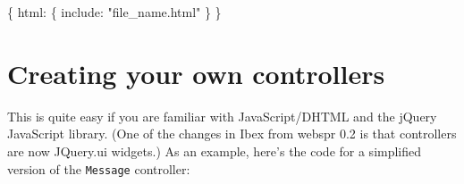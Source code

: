 \documentclass[
]{article}
\newenvironment{Shaded}{}{}
\newcommand{\DataTypeTok}[1]{\textcolor[rgb]{0.56,0.13,0.00}{#1}}
\newcommand{\NormalTok}[1]{#1}
\newcommand{\OperatorTok}[1]{\textcolor[rgb]{0.40,0.40,0.40}{#1}}
\newcommand{\StringTok}[1]{\textcolor[rgb]{0.25,0.44,0.63}{#1}}
\begin{document}
\begin{Shaded}
\begin{Highlighting}[]
\NormalTok{    \{ }\DataTypeTok{html}\OperatorTok{:}\NormalTok{ \{ }\DataTypeTok{include}\OperatorTok{:} \StringTok{"file\_name.html"}\NormalTok{ \} \}}
\end{Highlighting}
\end{Shaded}

\hypertarget{creating-your-own-controllers}{%
\section{Creating your own
controllers}\label{creating-your-own-controllers}}

This is quite easy if you are familiar with JavaScript/DHTML and the
jQuery JavaScript library. (One of the changes in Ibex from webspr 0.2
is that controllers are now JQuery.ui widgets.) As an example, here's
the code for a simplified version of the \texttt{Message} controller:
\end{document}
